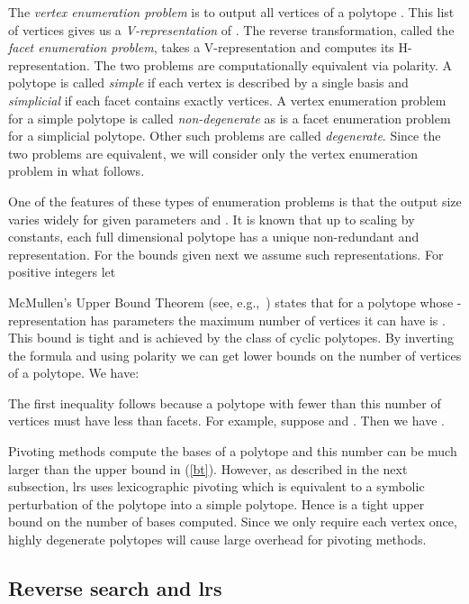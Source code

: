\documentclass[a4paper,11pt]{article}   \usepackage{authblk} \usepackage[top=1.9cm,bottom=1.9cm,left=1.9cm,right=1.9cm]{geometry}
\newcommand{\progname}{\textsf}
\newcommand{\lrs}{\progname{lrs}\xspace}
\begin{document}
The \emph{vertex enumeration problem} is to output all vertices of a
polytope . This list of vertices gives us a \emph{V-representation} of
. The reverse transformation, called the \emph{facet enumeration problem},
takes a V-representation and computes its
H-representation. The two problems are computationally equivalent via polarity.
A polytope is called {\em simple} if each vertex is described by a single basis
and {\em simplicial} if each facet contains exactly  vertices.
A vertex enumeration problem for a simple polytope is called {\em non-degenerate}
as is a facet enumeration problem for a simplicial polytope. Other
such problems are called {\em degenerate}.
Since the two problems are equivalent, we will consider only the vertex enumeration
problem in what follows.

One of the features of these types of enumeration problems is that the output
size varies widely for given
parameters  and . 
It is known that up to scaling by constants, each full dimensional polytope
has a unique  non-redundant  and  representation.
For the bounds given next we assume such representations.
For positive integers  let
\def\lf{\left\lfloor}
\def\rf{\right\rfloor}

McMullen's Upper Bound Theorem (see, e.g.,~\cite{Ziegler})
states that for a polytope whose -representation has parameters  
the maximum number of vertices it can have is . This bound is tight
and is achieved by the class of cyclic polytopes.
By inverting the formula and using polarity we can get lower bounds on the number of vertices of a polytope.
We have:

The first inequality follows because a polytope with fewer than this number of vertices must have less than  facets.
For example, suppose  and . Then we have . 

Pivoting methods compute the bases of a polytope and this number can be much larger than the upper bound in (\ref{bt}). 
However, as described in the next subsection, \lrs uses lexicographic pivoting which is equivalent to a symbolic perturbation
of the polytope into a simple polytope. Hence  is a tight upper bound on the number of
bases computed. Since we only require each vertex once, highly degenerate polytopes will
cause large overhead for pivoting methods. 

\subsection{Reverse search and \lrs}
\label{sec:lrs}
\end{document}
